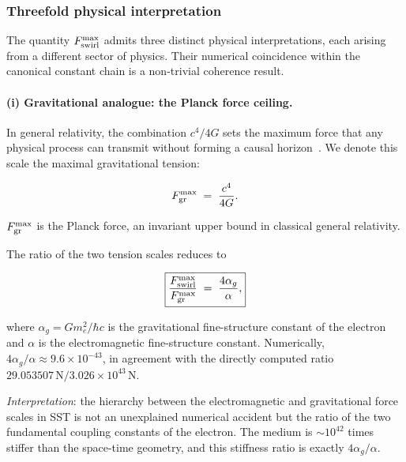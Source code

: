 \subsubsection{Threefold physical interpretation}

The quantity $F_{\rm swirl}^{\max}$ admits three distinct physical
interpretations, each arising from a different sector of physics.
Their numerical coincidence within the canonical constant chain
is a non-trivial coherence result.

\paragraph{(i) Gravitational analogue: the Planck force ceiling.}

In general relativity, the combination $c^4/4G$ sets the maximum
force that any physical process can transmit without forming a
causal horizon~\cite{Gibbons2002}. We denote this scale the maximal
gravitational tension:

\begin{equation}
  F_{\rm gr}^{\max} \;=\; \frac{c^4}{4G}.
  \label{eq:Fgr}
\end{equation}

 $F_{\rm gr}^{\max}$ is the Planck force,
an invariant upper bound in classical general relativity.

 The ratio of the two tension scales reduces to

\begin{equation}
  \boxed{
  \frac{F_{\rm swirl}^{\max}}{F_{\rm gr}^{\max}}
  \;=\; \frac{4\alpha_g}{\alpha},
  }
  \label{eq:ratio}
\end{equation}

\noindent
where $\alpha_g = Gm_e^2/\hbar c$ is the gravitational
fine-structure constant of the electron and $\alpha$ is the
electromagnetic fine-structure constant.
Numerically, $4\alpha_g/\alpha \approx 9.6\times10^{-43}$,
in agreement with the directly computed ratio
$29.053507\,\text{N} / 3.026\times10^{43}\,\text{N}$.

 \textit{Interpretation}:
the hierarchy between the electromagnetic and gravitational
force scales in SST is not an unexplained numerical accident
but the ratio of the two fundamental coupling constants of the
electron. The medium is $\sim\!10^{42}$ times stiffer than the
space-time geometry, and this stiffness ratio is exactly
$4\alpha_g/\alpha$.

